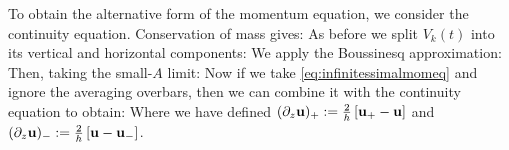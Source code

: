 \documentclass[10pt]{article}
\begin{document}
To obtain the alternative form of the momentum equation, we consider the continuity equation. Conservation of mass gives:
As before we split $V_{k}(t)$ into its vertical and horizontal components:
We apply the Boussinesq approximation:
Then, taking the small-$A$ limit:
Now if we take \cref{eq:infinitessimalmomeq} and ignore the averaging overbars, then we can combine it with the continuity equation to obtain:
Where we have  defined $(\partial_{z}\mathbf{u})_{+} : = \frac{2}{h}\left[\mathbf{u}_{+} - \mathbf{u}\right]$ and $(\partial_{z}\mathbf{u})_{-} : = \frac{2}{h}\left[\mathbf{u} - \mathbf{u}_{-}\right]$.
\end{document}
